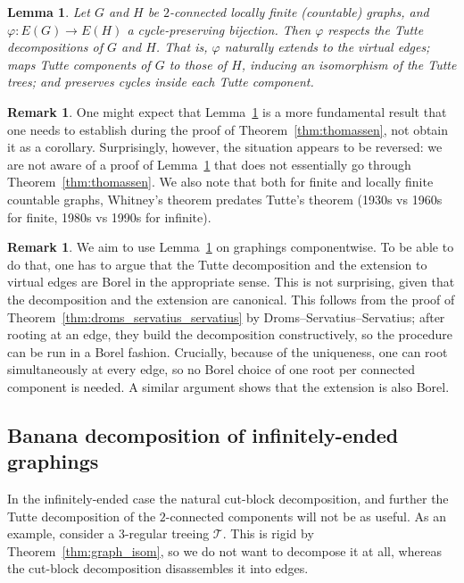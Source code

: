 \documentclass{article}
\theoremstyle{plain}
\newtheorem{lem}[thm]{Lemma}
\theoremstyle{definition}
\newtheorem{rem}[thm]{Remark}
\begin{document}
\begin{lem} \label{lemma:tutte_decomp_preserved}
    Let $G$ and $H$ be $2$-connected locally finite (countable) graphs, and $\varphi:E(G) \to E(H)$ a cycle-preserving bijection. Then $\varphi$ respects the Tutte decompositions of $G$ and $H$. That is, $\varphi$ naturally extends to the virtual edges; maps Tutte components of $G$ to those of $H$, inducing an isomorphism of the Tutte trees; and preserves cycles inside each Tutte component.
\end{lem}

\begin{rem}
    One might expect that Lemma~\ref{lemma:tutte_decomp_preserved} is a more fundamental result that one needs to establish during the proof of Theorem~\ref{thm:thomassen}, not obtain it as a corollary.  Surprisingly, however, the situation appears to be reversed: we are not aware of a proof of Lemma~\ref{lemma:tutte_decomp_preserved} that does not essentially go through Theorem~\ref{thm:thomassen}.
    We also note that both for finite and locally finite countable graphs, Whitney's theorem predates Tutte's theorem (1930s vs 1960s for finite, 1980s vs 1990s for infinite).
\end{rem}

\begin{rem} \label{rem:Tutte_decomp_borel}
    We aim to use Lemma~\ref{lemma:tutte_decomp_preserved} on graphings componentwise. To be able to do that, one has to argue that the Tutte decomposition and the extension to virtual edges are Borel in the appropriate sense. This is not surprising, given that the decomposition and the extension are canonical. This follows from the proof of Theorem~\ref{thm:droms_servatius_servatius} by Droms–Servatius–Servatius; after rooting at an edge, they build the decomposition constructively, so the procedure can be run in a Borel fashion. Crucially, because of the uniqueness, one can root simultaneously at every edge, so no Borel choice of one root per connected component is needed. A similar argument shows that the extension is also Borel. 
\end{rem}


\subsection{Banana decomposition of infinitely-ended graphings}

In the infinitely-ended case the natural cut-block decomposition, and further the Tutte decomposition of the $2$-connected components will not be as useful. As an example, consider a 3-regular treeing $\mathcal{T}$. This is rigid by Theorem~\ref{thm:graph_isom}, so we do not want to decompose it at all, whereas the cut-block decomposition disassembles it into edges.
\end{document}
